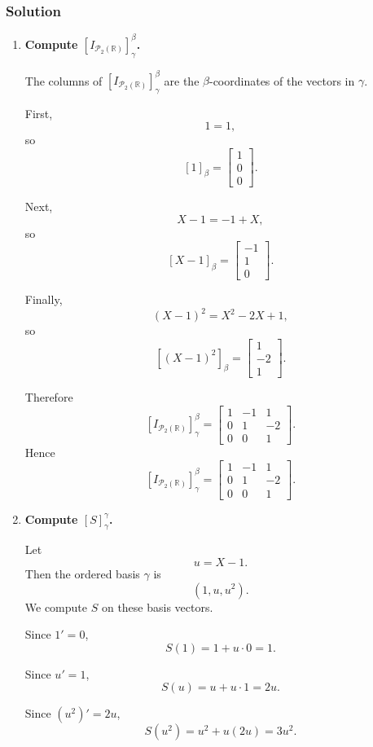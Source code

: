 \documentclass[12pt]{article}
\newcommand{\R}{\mathbb{R}}
\newcommand{\Ptwo}{\mathcal{P}_2(\R)}
\begin{document}
\subsubsection{Solution}

\begin{enumerate}[label=(\alph*)]
\item \textbf{Compute \([I_{\Ptwo}]^\beta_\gamma\).}

The columns of \([I_{\Ptwo}]^\beta_\gamma\) are the \(\beta\)-coordinates of the vectors in \(\gamma\).

First,
\[
1=1,
\]
so
\[
[1]_\beta=\begin{bmatrix}1\\0\\0\end{bmatrix}.
\]

Next,
\[
X-1=-1+X,
\]
so
\[
[X-1]_\beta=\begin{bmatrix}-1\\1\\0\end{bmatrix}.
\]

Finally,
\[
(X-1)^2=X^2-2X+1,
\]
so
\[
[(X-1)^2]_\beta=\begin{bmatrix}1\\-2\\1\end{bmatrix}.
\]

Therefore
\[
[I_{\Ptwo}]^\beta_\gamma
=
\begin{bmatrix}
1&-1&1\\
0&1&-2\\
0&0&1
\end{bmatrix}.
\]
Hence
\[
\boxed{
[I_{\Ptwo}]^\beta_\gamma
=
\begin{bmatrix}
1&-1&1\\
0&1&-2\\
0&0&1
\end{bmatrix}.}
\]

\item \textbf{Compute \([S]^\gamma_\gamma\).}

Let
\[
u=X-1.
\]
Then the ordered basis \(\gamma\) is
\[
(1,u,u^2).
\]
We compute \(S\) on these basis vectors.

Since \(1'=0\),
\[
S(1)=1+u\cdot 0=1.
\]

Since \(u'=1\),
\[
S(u)=u+u\cdot 1=2u.
\]

Since \((u^2)'=2u\),
\[
S(u^2)=u^2+u(2u)=3u^2.
\]


\end{enumerate}
\end{document}
